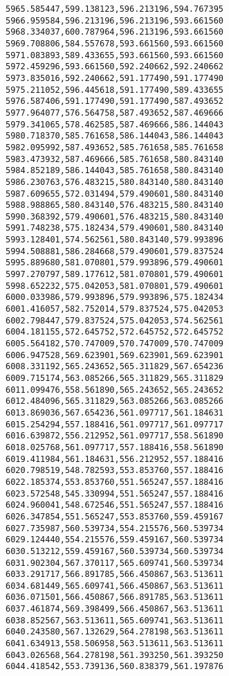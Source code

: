 \documentclass[11pt]{article}
\begin{document}
\begin{Verbatim}[commandchars=\\\{\}]
5965.585447,599.138123,596.213196,594.767395
5966.959584,596.213196,596.213196,593.661560
5968.334037,600.787964,596.213196,593.661560
5969.708806,584.557678,593.661560,593.661560
5971.083893,589.433655,593.661560,593.661560
5972.459296,593.661560,592.240662,592.240662
5973.835016,592.240662,591.177490,591.177490
5975.211052,596.445618,591.177490,589.433655
5976.587406,591.177490,591.177490,587.493652
5977.964077,576.564758,587.493652,587.469666
5979.341065,578.462585,587.469666,586.144043
5980.718370,585.761658,586.144043,586.144043
5982.095992,587.493652,585.761658,585.761658
5983.473932,587.469666,585.761658,580.843140
5984.852189,586.144043,585.761658,580.843140
5986.230763,576.483215,580.843140,580.843140
5987.609655,572.031494,579.490601,580.843140
5988.988865,580.843140,576.483215,580.843140
5990.368392,579.490601,576.483215,580.843140
5991.748238,575.182434,579.490601,580.843140
5993.128401,574.562561,580.843140,579.993896
5994.508881,586.284668,579.490601,579.837524
5995.889680,581.070801,579.993896,579.490601
5997.270797,589.177612,581.070801,579.490601
5998.652232,575.042053,581.070801,579.490601
6000.033986,579.993896,579.993896,575.182434
6001.416057,582.752014,579.837524,575.042053
6002.798447,579.837524,575.042053,574.562561
6004.181155,572.645752,572.645752,572.645752
6005.564182,570.747009,570.747009,570.747009
6006.947528,569.623901,569.623901,569.623901
6008.331192,565.243652,565.311829,567.654236
6009.715174,563.085266,565.311829,565.311829
6011.099476,558.561890,565.243652,565.243652
6012.484096,565.311829,563.085266,563.085266
6013.869036,567.654236,561.097717,561.184631
6015.254294,557.188416,561.097717,561.097717
6016.639872,556.212952,561.097717,558.561890
6018.025768,561.097717,557.188416,558.561890
6019.411984,561.184631,556.212952,557.188416
6020.798519,548.782593,553.853760,557.188416
6022.185374,553.853760,551.565247,557.188416
6023.572548,545.330994,551.565247,557.188416
6024.960041,548.672546,551.565247,557.188416
6026.347854,551.565247,553.853760,559.459167
6027.735987,560.539734,554.215576,560.539734
6029.124440,554.215576,559.459167,560.539734
6030.513212,559.459167,560.539734,560.539734
6031.902304,567.370117,565.609741,560.539734
6033.291717,566.891785,566.450867,563.513611
6034.681449,565.609741,566.450867,563.513611
6036.071501,566.450867,566.891785,563.513611
6037.461874,569.398499,566.450867,563.513611
6038.852567,563.513611,565.609741,563.513611
6040.243580,567.132629,564.278198,563.513611
6041.634913,558.506958,563.513611,563.513611
6043.026568,564.278198,561.393250,561.393250
6044.418542,553.739136,560.838379,561.197876

\end{Verbatim}
\end{document}
